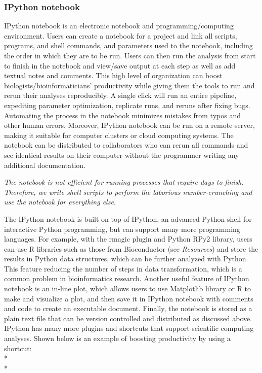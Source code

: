 \documentclass[ChapterTOCs,krantz2]{krantz} %
\begin{document}
\subsubsection{IPython notebook}

IPython notebook is an
electronic notebook and programming/computing environment.  
Users can create a notebook for a project and link all scripts,
programs, and shell commands, and parameters used to the notebook, including
the order in which they are to be run.  Users can then run the analysis from start to
finish in the notebook and view/save output at each step as well as add textual
notes and comments.   This high level of organization can boost
biologists/bioinformaticians' productivity while giving them the tools to run
and rerun their analyses reproducibly.  A single click will run an entire
pipeline, expediting parameter optimization, replicate runs, and reruns after
fixing bugs.  Automating the process in the notebook minimizes mistakes from
typos and other human errors.  Moreover, IPython notebook can be run on a
remote server, making it suitable for computer clusters or
cloud computing systems. The notebook can be distributed to
collaborators who can rerun all commands and see identical results on their
computer without the programmer writing any additional documentation.

\textsl{The notebook is not efficient
for running processes that require days to finish.  Therefore, we write
shell scripts to perform the laborious number-crunching and use the notebook
for everything else.}

The IPython notebook is built on top of IPython, an advanced Python shell for
interactive Python programming, but can support many more programming
languages.
For example, with the rmagic plugin and Python RPy2 library, users can
use R libraries such as those from Bioconductor (see \emph{Resources})
and store the results in Python data structures, which can be further analyzed 
with Python.
This feature reducing the number of steps in
data transformation, which is a common problem in
bioinformatics research.
Another useful feature of IPython notebook is an in-line plot, which allows
users to use Matplotlib library or R to make and visualize a plot, and then save it
in IPython notebook with comments and code to create an executable document.
Finally, the notebook is stored as a plain text file that can be version controlled
and distributed as discussed above.
IPython has many more plugins and shortcuts that support scientific
computing analyses.
Shown below is an example of boosting productivity by using a shortcut:\\*\\*
\end{document}
